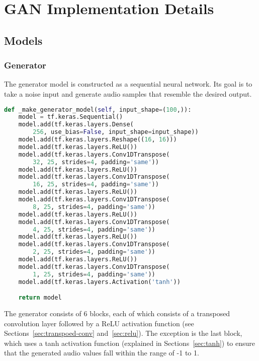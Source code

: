 \chapter{GAN Implementation Details} \label{ann:GAN}

\section{Models}

\subsection{Generator}

The generator model is constructed as a sequential neural network. Its goal is to take a noise input and generate audio samples that resemble the desired output.

\begin{lstlisting}[language=Python, caption={Generator initialization}]
def _make_generator_model(self, input_shape=(100,)):
    model = tf.keras.Sequential()
    model.add(tf.keras.layers.Dense(
        256, use_bias=False, input_shape=input_shape))
    model.add(tf.keras.layers.Reshape((16, 16)))
    model.add(tf.keras.layers.ReLU())
    model.add(tf.keras.layers.Conv1DTranspose(
        32, 25, strides=4, padding='same'))
    model.add(tf.keras.layers.ReLU())
    model.add(tf.keras.layers.Conv1DTranspose(
        16, 25, strides=4, padding='same'))
    model.add(tf.keras.layers.ReLU())
    model.add(tf.keras.layers.Conv1DTranspose(
        8, 25, strides=4, padding='same'))
    model.add(tf.keras.layers.ReLU())
    model.add(tf.keras.layers.Conv1DTranspose(
        4, 25, strides=4, padding='same'))
    model.add(tf.keras.layers.ReLU())
    model.add(tf.keras.layers.Conv1DTranspose(
        2, 25, strides=4, padding='same'))
    model.add(tf.keras.layers.ReLU())
    model.add(tf.keras.layers.Conv1DTranspose(
        1, 25, strides=4, padding='same'))
    model.add(tf.keras.layers.Activation('tanh'))

    return model
\end{lstlisting}

The generator consists of 6 blocks, each of which consists of a transposed convolution layer followed by a \ac{ReLU} activation function (see Sections~\ref{sec:transpoed-conv} and~\ref{sec:relu}). The exception is the last block, which uses a \ac{tanh} activation function (explained in Sections~\ref{sec:tanh}) to ensure that the generated audio values fall within the range of -1 to 1.

